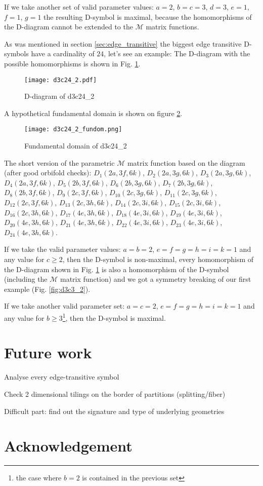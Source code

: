 \documentclass[12pt,a4paper]{article}
\theoremstyle{plain}%
\theoremstyle{definition}
\theoremstyle{remark}
\begin{document}
If we take another set of valid parameter values: $a=2$, $b=c=3$, $d=3$, $e=1$,
$f=1$, $g=1$ the resulting D-symbol is maximal, because the homomorphisms of the
D-diagram cannot be extended to the $\mathcal{M}$ matrix functions.

As was mentioned in section \ref{sec:edge_transitive} the biggest edge
transitive D-symbols have a cardinality of $24$, let's see an example:
The D-diagram with the possible homomorphisms is shown in Fig.
\ref{fig:d3c24_2}.

\begin{figure}
  \caption{\label{fig:d3c24_2} D-diagram of d3c24\_2}
  \center
  \texttt{[image: d3c24\_2.pdf]}
\end{figure}

A hypothetical fundamental domain is shown on figure \ref{fig:d3c24_2_fundom}.

\begin{figure}
  \caption{\label{fig:d3c24_2_fundom} Fundamental domain of d3c24\_2}
  \center
  \texttt{[image: d3c24\_2\_fundom.png]}
\end{figure}

The short version of the parametric $\mathcal{M}$ matrix function based on the
diagram (after good orbifold checks): $D_1(2a, 3f, 6k)$, $D_2(2a, 3g, 6k)$,
$D_3(2a, 3g, 6k)$, $D_4(2a, 3f, 6k)$, $D_5(2b, 3f, 6k)$, $D_6(2b, 3g, 6k)$,
$D_7(2b, 3g, 6k)$, $D_8(2b, 3f, 6k)$, $D_9(2c, 3f, 6k)$, $D_{10}(2c, 3g, 6k)$,
$D_{11}(2c, 3g, 6k)$, $D_{12}(2c, 3f, 6k)$, $D_{13}(2c, 3h, 6k)$, $D_{14}(2c,
3i, 6k)$, $D_{15}(2c, 3i, 6k)$, $D_{16}(2c, 3h, 6k)$, $D_{17}(4e, 3h, 6k)$,
$D_{18}(4e, 3i, 6k)$, $D_{19}(4e, 3i, 6k)$, $D_{20}(4e, 3h, 6k)$, $D_{21}(4e,
3h, 6k)$, $D_{22}(4e, 3i, 6k)$, $D_{23}(4e, 3i, 6k)$, $D_{24}(4e, 3h, 6k)$.

If we take the valid parameter values: $a=b=2$, $e=f=g=h=i=k=1$ and any value
for $c\geq2$, then the D-symbol is non-maximal, every homomorphism of the
D-diagram shown in Fig. \ref{fig:d3c24_2} is also a homomorphism of the D-symbol
(including the $\mathcal{M}$ matrix function) and we got a symmetry breaking of
our first example (Fig. \ref{fig:d3c3_2}).

If we take another valid parameter set: $a=c=2$, $e=f=g=h=i=k=1$ and any value
for $b\geq3$\footnote{the case where $b=2$ is contained in the previous set},
then the D-symbol is maximal.

\section{Future work}
Analyse every edge-transitive symbol

Check 2 dimensional tilings on the border of partitions (splitting/fiber)

Difficult part: find out the signature and type of underlying geometries

\section{Acknowledgement}


\nocite{DHM93,D87,Du88,H93,LM90,Ma67,M94,T82,VS93,F94,M11,DDH98,K11}


\end{document}
